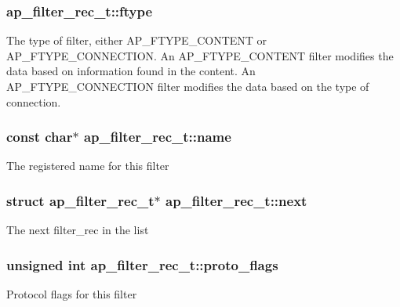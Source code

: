 \subsubsection[{\texorpdfstring{ftype}{ftype}}]{ ap\+\_\+filter\+\_\+rec\+\_\+t\+::ftype}\hypertarget{structap__filter__rec__t_a11dd49760277c33affdb52e9d6f099da}{}\label{structap__filter__rec__t_a11dd49760277c33affdb52e9d6f099da}
The type of filter, either A\+P\+\_\+\+F\+T\+Y\+P\+E\+\_\+\+C\+O\+N\+T\+E\+NT or A\+P\+\_\+\+F\+T\+Y\+P\+E\+\_\+\+C\+O\+N\+N\+E\+C\+T\+I\+ON. An A\+P\+\_\+\+F\+T\+Y\+P\+E\+\_\+\+C\+O\+N\+T\+E\+NT filter modifies the data based on information found in the content. An A\+P\+\_\+\+F\+T\+Y\+P\+E\+\_\+\+C\+O\+N\+N\+E\+C\+T\+I\+ON filter modifies the data based on the type of connection. 
\subsubsection[{\texorpdfstring{name}{name}}]{\setlength{\rightskip}{0pt plus 5cm}const char$\ast$ ap\+\_\+filter\+\_\+rec\+\_\+t\+::name}\hypertarget{structap__filter__rec__t_a85fe13ba0e1802986e19a56858d3198e}{}\label{structap__filter__rec__t_a85fe13ba0e1802986e19a56858d3198e}
The registered name for this filter 
\subsubsection[{\texorpdfstring{next}{next}}]{\setlength{\rightskip}{0pt plus 5cm}struct {\bf ap\+\_\+filter\+\_\+rec\+\_\+t}$\ast$ ap\+\_\+filter\+\_\+rec\+\_\+t\+::next}\hypertarget{structap__filter__rec__t_a66a9bbdf6696798b2749bd98eb34badf}{}\label{structap__filter__rec__t_a66a9bbdf6696798b2749bd98eb34badf}
The next filter\+\_\+rec in the list 
\subsubsection[{\texorpdfstring{proto\+\_\+flags}{proto_flags}}]{\setlength{\rightskip}{0pt plus 5cm}unsigned {\bf int} ap\+\_\+filter\+\_\+rec\+\_\+t\+::proto\+\_\+flags}\hypertarget{structap__filter__rec__t_a5fbc2be1250c3f6084b358fdf59fa4ef}{}\label{structap__filter__rec__t_a5fbc2be1250c3f6084b358fdf59fa4ef}
Protocol flags for this filter 
